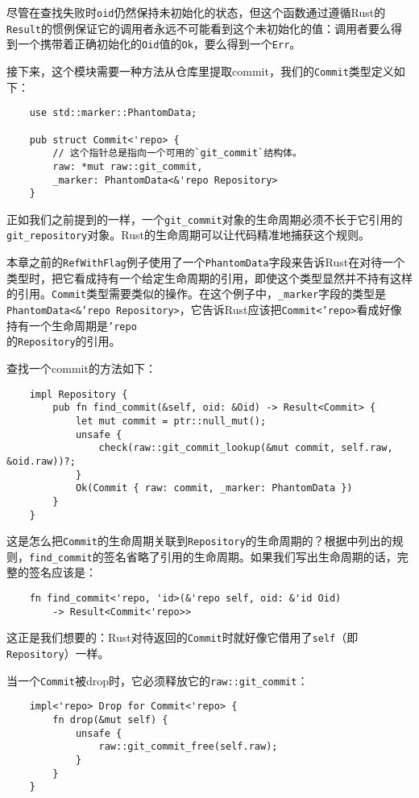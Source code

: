 尽管在查找失败时\texttt{oid}仍然保持未初始化的状态，但这个函数通过遵循Rust的\texttt{Result}的惯例保证它的调用者永远不可能看到这个未初始化的值：调用者要么得到一个携带着正确初始化的\texttt{Oid}值的\texttt{Ok}，要么得到一个\texttt{Err}。

接下来，这个模块需要一种方法从仓库里提取commit，我们的\texttt{Commit}类型定义如下：
\begin{verbatim}
    use std::marker::PhantomData;

    pub struct Commit<'repo> {
        // 这个指针总是指向一个可用的`git_commit`结构体。
        raw: *mut raw::git_commit,
        _marker: PhantomData<&'repo Repository>
    }
\end{verbatim}

正如我们之前提到的一样，一个\texttt{git\_commit}对象的生命周期必须不长于它引用的\\
\texttt{git\_repository}对象。Rust的生命周期可以让代码精准地捕获这个规则。

本章之前的\texttt{RefWithFlag}例子使用了一个\texttt{PhantomData}字段来告诉Rust在对待一个类型时，把它看成持有一个给定生命周期的引用，即使这个类型显然并不持有这样的引用。\texttt{Commit}类型需要类似的操作。在这个例子中，\texttt{\_marker}字段的类型是\texttt{PhantomData<\&'repo Repository>}，它告诉Rust应该把\texttt{Commit<'repo>}看成好像持有一个生命周期是\texttt{'repo}\\
的\texttt{Repository}的引用。

查找一个commit的方法如下：
\begin{verbatim}
    impl Repository {
        pub fn find_commit(&self, oid: &Oid) -> Result<Commit> {
            let mut commit = ptr::null_mut();
            unsafe {
                check(raw::git_commit_lookup(&mut commit, self.raw, &oid.raw))?;
            }
            Ok(Commit { raw: commit, _marker: PhantomData })
        }
    }
\end{verbatim}

这是怎么把\texttt{Commit}的生命周期关联到\texttt{Repository}的生命周期的？根据中列出的规则，\texttt{find\_commit}的签名省略了引用的生命周期。如果我们写出生命周期的话，完整的签名应该是：
\begin{verbatim}
    fn find_commit<'repo, 'id>(&'repo self, oid: &'id Oid)
        -> Result<Commit<'repo>>
\end{verbatim}

这正是我们想要的：Rust对待返回的\texttt{Commit}时就好像它借用了\texttt{self}（即\texttt{Repository}）一样。

当一个\texttt{Commit}被drop时，它必须释放它的\texttt{raw::git\_commit}：
\begin{verbatim}
    impl<'repo> Drop for Commit<'repo> {
        fn drop(&mut self) {
            unsafe {
                raw::git_commit_free(self.raw);
            }
        }
    }
\end{verbatim}

